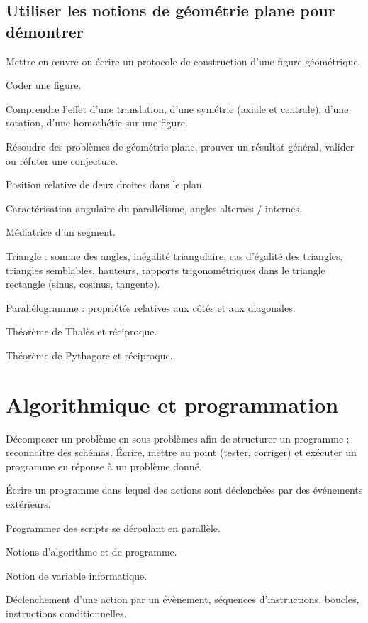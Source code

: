 \documentclass[11pt]{article}
\begin{document}
\subsection{Utiliser les notions de géométrie plane pour démontrer}

\begin{todolist}
    \item Mettre en œuvre ou écrire un protocole de construction d’une figure géométrique.
    \item Coder une figure.
    \item Comprendre l’effet d’une translation, d’une symétrie (axiale et centrale), d’une rotation, d’une homothétie sur une figure.
    \item Résoudre des problèmes de géométrie plane, prouver un résultat général, valider ou réfuter une conjecture.
    \item Position relative de deux droites dans le plan.
    \item Caractérisation angulaire du parallélisme, angles alternes / internes.
    \item Médiatrice d’un segment.
    \item Triangle : somme des angles, inégalité triangulaire, cas d’égalité des triangles, triangles semblables, hauteurs, rapports trigonométriques dans le triangle rectangle (sinus, cosinus, tangente).
    \item Parallélogramme : propriétés relatives aux côtés et aux diagonales.
    \item Théorème de Thalès et réciproque.
    \item Théorème de Pythagore et réciproque.
\end{todolist}

\section{Algorithmique et programmation}

\begin{todolist}
    \item Décomposer un problème en sous-problèmes afin de structurer un programme ; reconnaître des schémas. Écrire, mettre au point (tester, corriger) et exécuter un programme en réponse à un problème donné.
    \item Écrire un programme dans lequel des actions sont déclenchées par des événements extérieurs.
    \item Programmer des scripts se déroulant en parallèle.
    \item Notions d’algorithme et de programme.
    \item Notion de variable informatique.
    \item Déclenchement d’une action par un évènement, séquences d’instructions, boucles, instructions conditionnelles.
\end{todolist}
\end{document}
